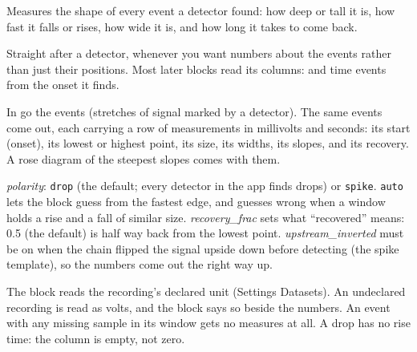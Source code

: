 Measures the shape of every event a detector found: how deep or tall it is, how fast it
falls or rises, how wide it is, and how long it takes to come back.

Straight after a detector, whenever you want numbers about the events rather than just their
positions. Most later blocks read its columns:  and
 time events from the onset it finds.

In go the events (stretches of signal marked by a detector). The same events come out, each
carrying a row of measurements in millivolts and seconds: its start (onset), its lowest or
highest point, its size, its widths, its slopes, and its recovery. A rose diagram of the
steepest slopes comes with them.

\emph{polarity}: \texttt{drop} (the default; every detector in the app finds drops) or
\texttt{spike}. \texttt{auto} lets the block guess from the fastest edge, and guesses wrong
when a window holds a rise and a fall of similar size. \emph{recovery\_frac} sets what
``recovered'' means: 0.5 (the default) is half way back from the lowest point.
\emph{upstream\_inverted} must be on when the chain flipped the signal upside down before
detecting (the spike template), so the numbers come out the right way up.

The block reads the recording's declared unit (Settings \guilsinglright{} Datasets). An
undeclared recording is read as volts, and the block says so beside the numbers. An event
with any missing sample in its window gets no measures at all. A drop has no rise time: the
column is empty, not zero.

